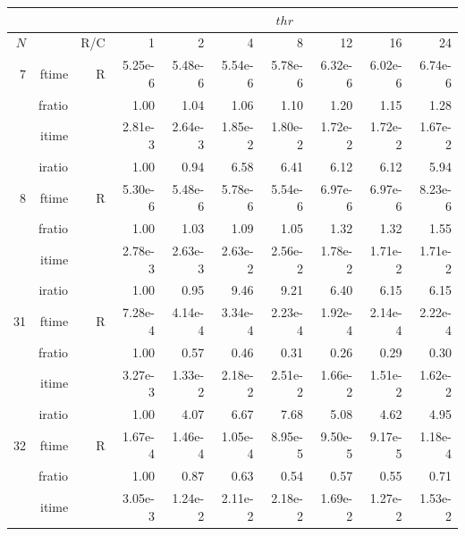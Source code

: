 \documentclass[a4paper]{article}
\begin{document}
\begin{table}[htbp]
\begin{center}
\begin{small}
\begin{tabular}{|r|r|r|r|r|r|r|r|r|r|}
\hline 
     \multicolumn{3}{|c|}{ } & \multicolumn{7}{c|}{$thr$} \\ \hline
    $N$  & & R/C  & 1           & 2    & 4    & 8    & 12   & 16    & 24  \\ \hline\hline
    7  & ftime & R  &   5.25e-6 &   5.48e-6 &   5.54e-6 &   5.78e-6 &   6.32e-6 &   6.02e-6 &   6.74e-6    \\ 
    & fratio & &        1.00 &   1.04 &   1.06 &   1.10 &   1.20 &   1.15 &   1.28   \\ 
     & itime & &        2.81e-3 &   2.64e-3 &   1.85e-2 &   1.80e-2 &   1.72e-2 &   1.72e-2 &   1.67e-2       \\ 
     & iratio & &       1.00 &   0.94 &   6.58 &   6.41 &   6.12 &   6.12 &   5.94         \\ \hline 
    8  & ftime & R  &   5.30e-6 &   5.48e-6 &   5.78e-6 &   5.54e-6 &   6.97e-6 &   6.97e-6 &   8.23e-6    \\ 
      & fratio & &      1.00 &   1.03 &   1.09 &   1.05 &   1.32 &   1.32 &   1.55     \\ 
     & itime & &        2.78e-3 &   2.63e-3 &   2.63e-2 &   2.56e-2 &   1.78e-2 &   1.71e-2 &   1.71e-2       \\ 
     & iratio & &       1.00 &   0.95 &   9.46 &   9.21 &   6.40 &   6.15 &   6.15      \\ \hline 
   31  & ftime & R  &   7.28e-4 &   4.14e-4 &   3.34e-4 &   2.23e-4 &   1.92e-4 &   2.14e-4 &   2.22e-4   \\ 
      & fratio & &      1.00 &   0.57 &   0.46 &   0.31 &   0.26 &   0.29 &   0.30      \\ 
     & itime & &        3.27e-3 &   1.33e-2 &   2.18e-2 &   2.51e-2 &   1.66e-2 &   1.51e-2 &   1.62e-2      \\ 
     & iratio & &       1.00 &   4.07 &   6.67 &   7.68 &   5.08 &   4.62 &   4.95     \\ \hline 
   32  & ftime & R  &   1.67e-4 &   1.46e-4 &   1.05e-4 &   8.95e-5 &   9.50e-5 &   9.17e-5 &   1.18e-4   \\ 
      & fratio & &      1.00 &   0.87 &   0.63 &   0.54 &   0.57 &   0.55 &   0.71       \\ 
     & itime & &        3.05e-3 &   1.24e-2 &   2.11e-2 &   2.18e-2 &   1.69e-2 &   1.27e-2 &   1.53e-2       \\ 

\end{tabular}
\end{small}
\end{center}
\end{table}
\end{document}
